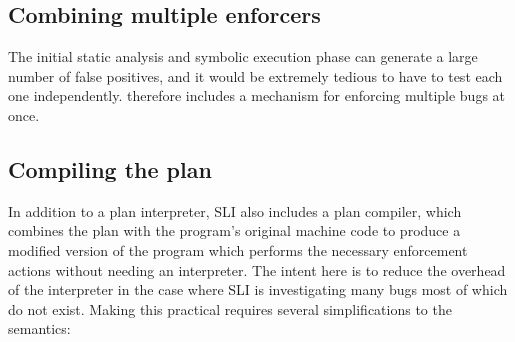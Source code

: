 \subsection{Combining multiple enforcers}
\label{sect:enforce:combine_enforcers}

The initial static analysis and symbolic execution phase can generate
a large number of false positives, and it would be extremely tedious
to have to test each one independently.  {\Implementation} therefore
includes a mechanism for enforcing multiple bugs at once.


\subsection{Compiling the plan}
\label{sect:enforce:compiling}


In addition to a plan interpreter, SLI also includes a plan compiler, which combines the plan with the program's original machine code to produce a modified version of the program which performs the necessary enforcement actions without needing an interpreter.
The intent here is to reduce the overhead of the interpreter in the case where SLI is investigating many bugs most of which do not exist.
Making this practical requires several simplifications to the semantics:

